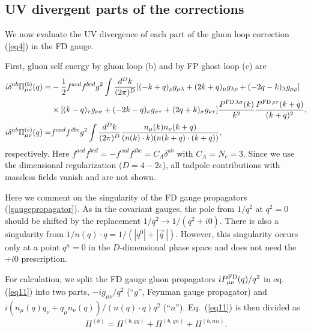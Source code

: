 \documentclass[preprint,amsmath,amssymb,superscriptaddress, floatfix,nofootinbib]{revtex4}
\begin{document}

\subsection{UV divergent parts of the corrections}

We now evaluate the UV divergence of each part of the 
gluon loop correction (\ref{eq4}) in the FD gauge. 

First, 
gluon self energy by gluon loop (b) and by FP ghost loop (c) are 
\begin{align}
i\delta^{ab}\Pi^{(b)}_{\mu\nu}(q) = & -\frac{1}{2}f^{acd}f^{bcd}g^2 
\int \frac{d^D k}{(2\pi)^D}
[(-k+q)_{\rho}g_{\mu\lambda}+(2k+q)_{\mu}g_{\lambda\rho}+(-2q-k)_{\lambda}g_{\mu\rho}]
\nonumber \\
& \times 
[(k-q)_{\tau}g_{\nu\sigma}+(-2k-q)_{\nu}g_{\sigma\tau}+(2q+k)_{\sigma}g_{\nu\tau}]
\frac{P^{{\rm FD}\,\lambda\sigma}(k)}{k^2} 
\frac{P^{{\rm FD}\,\rho\tau}(k+q)}{(k+q)^2} , \label{eq11}
\\
%
i\delta^{ab}\Pi^{(c)}_{\mu\nu}(q) =& f^{cad}f^{dbc}g^2 
\int \frac{d^D k}{(2\pi)^D} \frac{n_{\mu}(k)n_{\nu}(k+q)}
{(n(k)\cdot k) (n(k+q)\cdot (k+q))} , \label{eq12}
\end{align}
respectively. 
Here $f^{acd}f^{bcd}=-f^{cad}f^{dbc}=C_A\delta^{ab}$ with $C_A=N_c=3$. 
Since we use the dimensional regularization ($D=4-2\epsilon$), all tadpole 
contributions with massless fields vanish and are not shown.  

Here we comment on the singularity of the FD gauge propagators (\ref{gaugepropagator}). 
As in the covariant gauges, 
the pole from $1/q^2$ at $q^2=0$ should be shifted by the replacement 
$1/q^2\to 1/(q^2+i0)$. 
There is also a singularity from $1/n(q)\cdot q=1/(|q^0|+|\vec{q}\,|)$. 
However, this singularity occurs only at a point $q^{\mu}=0$ in the $D$-dimensional 
phase space and does not need the $+i0$ prescription.

For calculation, 
we split the FD gauge gluon propagators $iP^{\rm FD}_{\mu\nu}(q)/q^2$ in eq.\,(\ref{eq11})
into two parts, $-ig_{\mu\nu}/q^2$ (``$g$'', Feynman gauge propagator) 
and $i(n_{\mu}(q)q_{\nu}+q_{\mu}n_{\nu}(q))/(n(q)\cdot q)q^2$ (``$n$''). 
Eq.~(\ref{eq11})  is then divided as 
\begin{eqnarray}
\Pi^{(b)}=\Pi^{(b, gg)}+\Pi^{(b, gn)}+\Pi^{(b, nn)}.
\end{eqnarray}
\end{document}
